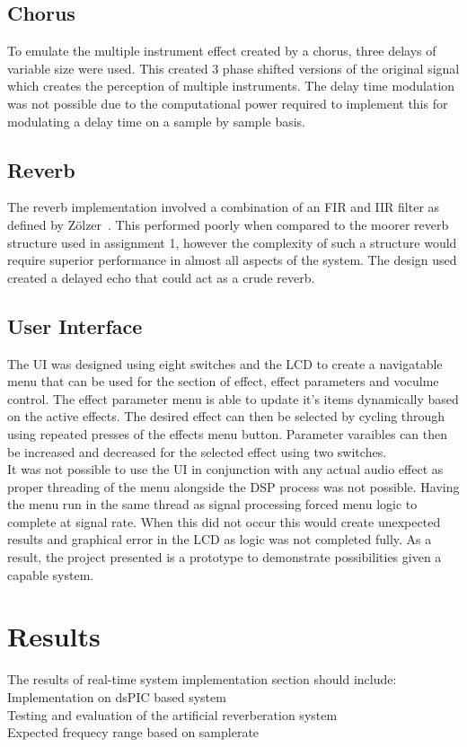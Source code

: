 \documentclass[titlepage]{scrartcl}
\begin{document}
    \subsection{Chorus}
    To emulate the multiple instrument effect created by a chorus, three delays
    of variable size were used. This created 3 phase shifted versions of the
    original signal which creates the perception of multiple instruments. The
    delay time modulation was not possible due to the computational power
    required to implement this for modulating a delay time on a sample by
    sample basis.

    \subsection{Reverb}
    The reverb implementation involved a combination of an FIR and IIR filter
    as defined by Z{\"o}lzer~\citeyearpar[p.]{zolzer2011dafx}. This performed
    poorly when compared to the moorer reverb structure used in assignment 1,
    however the complexity of such a structure would require superior
    performance in almost all aspects of the system.
    The design used created a delayed echo that could act as a crude reverb.

    \subsection{User Interface}
    The UI was designed using eight switches and the LCD to create a
    navigatable menu that can be used for the section of effect, effect
    parameters and voculme control. The effect parameter menu is able to update
    it's items dynamically based on the active effects. The desired effect can
    then be selected by cycling through using repeated presses of the effects
    menu button. Parameter varaibles can then be increased and decreased for
    the selected effect using two switches.\\
    It was not possible to use the UI in conjunction with any actual audio
    effect as proper threading of the menu alongside the DSP process was not
    possible. Having the menu run in the same thread as signal processing
    forced menu logic to complete at signal rate. When this did not occur this
    would create unexpected results and graphical error in the LCD as logic was
    not completed fully. As a result, the project presented is a prototype to
    demonstrate possibilities given a capable system.

    \section{Results}
    The results of real-time system implementation section should include:\\
        Implementation on dsPIC based system\\
        Testing and evaluation of the artificial reverberation system\\
        Expected frequecy range based on samplerate
\end{document}
